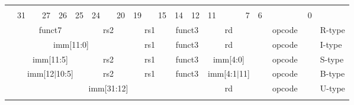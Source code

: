 
\newpage

\begin{table}[p]
\begin{small}
\begin{center}
    \begin{tabular} {p{0.002in}p{0.002in}p{0.002in}p{0.002in}p{0.002in}p{0.002in}p{0.002in}p{0.002in}p{0.002in}p{0.002in}p{0.002in}p{0.002in}p{0.002in}p{0.002in}p{0.002in}p{0.002in}p{0.002in}p{0.002in}p{0.002in}p{0.002in}p{0.002in}p{0.002in}p{0.002in}p{0.002in}p{0.002in}p{0.002in}p{0.002in}p{0.002in}p{0.002in}p{0.002in}p{0.002in}p{0.002in}p{0.002in}l}
    & & & & & & & & & & & & & & & & & & & & & & & & & & & & & & & & \\

            &

    \multicolumn{3}{l}{31} &
    \multicolumn{2}{r}{27} &
    \multicolumn{1}{c}{26} &
    \multicolumn{1}{r}{25} &
    \multicolumn{3}{l}{24} &
    \multicolumn{2}{r}{20} &
    \multicolumn{3}{l}{19} &
    \multicolumn{2}{r}{15} &
    \multicolumn{2}{l}{14} &
    \multicolumn{1}{r}{12} &
    \multicolumn{4}{l}{11} &
    \multicolumn{1}{r}{7} &
    \multicolumn{6}{l}{6} &
    \multicolumn{1}{r}{0} \\
    \cline{2-33}
&


\multicolumn{7}{|c|}{funct7} &
\multicolumn{5}{c|}{rs2} &
\multicolumn{5}{c|}{rs1} &
\multicolumn{3}{c|}{funct3} &
\multicolumn{5}{c|}{rd} &
\multicolumn{7}{|c|}{opcode} & R-type \\
\cline{2-33}
&

\multicolumn{12}{|c|}{imm[11:0]} &
\multicolumn{5}{c|}{rs1} &
\multicolumn{3}{c|}{funct3} &
\multicolumn{5}{c|}{rd} &
\multicolumn{7}{|c|}{opcode} & I-type \\
\cline{2-33}
&

\multicolumn{7}{|c|}{imm[11:5]} &
\multicolumn{5}{c|}{rs2} &
\multicolumn{5}{c|}{rs1} &
\multicolumn{3}{c|}{funct3} &
\multicolumn{5}{c|}{imm[4:0]} &
\multicolumn{7}{|c|}{opcode} & S-type \\
\cline{2-33}
&

\multicolumn{7}{|c|}{imm[12$\vert$10:5]} &
\multicolumn{5}{c|}{rs2} &
\multicolumn{5}{c|}{rs1} &
\multicolumn{3}{c|}{funct3} &
\multicolumn{5}{c|}{imm[4:1$\vert$11]} &
\multicolumn{7}{|c|}{opcode} & B-type \\
\cline{2-33}
&

\multicolumn{20}{|c|}{imm[31:12]} &
\multicolumn{5}{c|}{rd} &
\multicolumn{7}{|c|}{opcode} & U-type \\
\cline{2-33}
&


\end{tabular}
\end{center}
\end{small}
\end{table}
